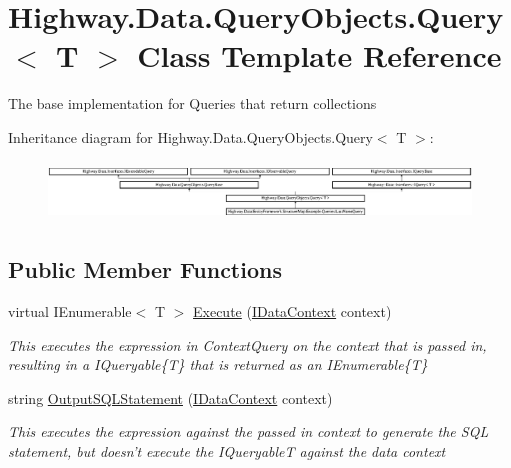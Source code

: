 \hypertarget{class_highway_1_1_data_1_1_query_objects_1_1_query-g}{\section{Highway.\-Data.\-Query\-Objects.\-Query$<$ T $>$ Class Template Reference}
\label{class_highway_1_1_data_1_1_query_objects_1_1_query-g}
}


The base implementation for Queries that return collections  


Inheritance diagram for Highway.\-Data.\-Query\-Objects.\-Query$<$ T $>$\-:\begin{figure}[H]
\begin{center}
\leavevmode
\includegraphics[height=1.578577cm]{class_highway_1_1_data_1_1_query_objects_1_1_query-g}
\end{center}
\end{figure}
\subsection*{Public Member Functions}
\begin{DoxyCompactItemize}
\item 
virtual I\-Enumerable$<$ T $>$ \hyperlink{class_highway_1_1_data_1_1_query_objects_1_1_query-g_a68dd6db173a8ea84d10d72ccc27f74f4}{Execute} (\hyperlink{interface_highway_1_1_data_1_1_interfaces_1_1_i_data_context}{I\-Data\-Context} context)
\begin{DoxyCompactList}\small\item\em This executes the expression in Context\-Query on the context that is passed in, resulting in a I\-Queryable\{\-T\} that is returned as an I\-Enumerable\{\-T\} \end{DoxyCompactList}\item 
string \hyperlink{class_highway_1_1_data_1_1_query_objects_1_1_query-g_a73d9b26cc05e595ea45e5ba03e0812ba}{Output\-S\-Q\-L\-Statement} (\hyperlink{interface_highway_1_1_data_1_1_interfaces_1_1_i_data_context}{I\-Data\-Context} context)
\begin{DoxyCompactList}\small\item\em This executes the expression against the passed in context to generate the S\-Q\-L statement, but doesn't execute the I\-Queryable{\itshape T}  against the data context \end{DoxyCompactList}\end{DoxyCompactItemize}
